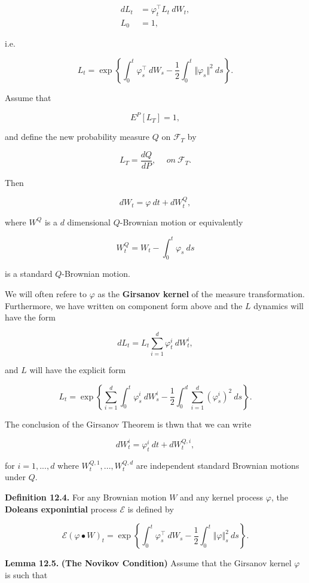 \documentclass[
]{article}
\begin{document}
\begin{align*}
dL_t&=\varphi^\top_t L_t\ dW_t,\\
L_0&=1,
\end{align*}

i.e.

\[
L_t = \exp\left\{\int_0^t \varphi^\top_s\ dW_s - \frac{1}{2}\int_0^t \Vert\varphi_s\Vert ^2\ ds\right\}.
\]

Assume that

\[
E^P[L_T]=1,
\]

and define the new probability measure \(Q\) on \(\mathcal{F}_T\) by

\[
L_T=\frac{dQ}{dP},\hspace{15pt}on\ \mathcal{F}_T.
\]

Then

\[
dW_t=\varphi\ dt+dW_t^Q,
\]

where \(W^Q\) is a \(d\) dimensional \(Q\)-Brownian motion or
equivalently

\[
W_t^Q=W_t-\int_0^t\varphi_s\ ds
\]

is a standard \(Q\)-Brownian motion.

We will often refere to \(\varphi\) as the \textbf{Girsanov kernel} of
the measure transformation. Furthermore, we have written on component
form above and the \(L\) dynamics will have the form

\[
dL_t=L_t\sum_{i=1}^d\varphi^i_t\ dW_t^i,
\]

and \(L\) will have the explicit form

\[
L_t=\exp\left\{\sum_{i=1}^d\int_0^t\varphi^i_s\ dW_s^i - \frac{1}{2}\int_0^d\sum_{i=1}^d(\varphi^i_s)^2\ ds\right\}.
\]

The conclusion of the Girsanov Theorem is thwn that we can write

\[
dW_t^i=\varphi_t^i\ dt+dW_t^{Q,i},
\]

for \(i=1,...,d\) where \(W_t^{Q,1},...,W_t^{Q,d}\) are independent
standard Brownian motions under \(Q\).

\textbf{Definition 12.4.} For any Brownian motion \(W\) and any kernel
process \(\varphi\), the \textbf{Doleans exponintial} process
\(\mathcal{E}\) is defined by

\[
\mathcal{E}(\varphi\bullet W)_t=\exp\left\{\int_0^t\varphi^\top_s\ dW_s -\frac{1}{2}\int_0^t\Vert \varphi\Vert^2_s\ ds\right\}.
\]

\textbf{Lemma 12.5.} \textbf{(The Novikov Condition)} Assume that the
Girsanov kernel \(\varphi\) is such that
\end{document}
